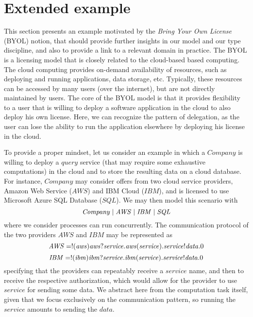 \section{Extended example}\label{sec:BYOL_example}

This section presents an example motivated by the \emph{Bring Your Own License} (BYOL)
notion, that should provide further insights in our model and our type discipline, and also to provide a link to 
a relevant domain in practice.
The BYOL is a licensing model that is closely related  to the cloud-based based computing. The cloud computing provides on-demand availability of resources, such as deploying and running applications, data storage, etc. Typically, these resources can be accessed by many users (over the internet), but are not directly maintained by users. The core of the BYOL model is that it provides flexibility to a user that is willing to deploy a software 
application in the cloud to also deploy his own license. Here, we  can recognize the pattern of delegation, as the user can lose the ability to run the application elsewhere by deploying his license in the cloud.

To provide a proper mindset, let us consider an example in which a $\mathit{Company}$ is willing to deploy
a $\mathit{query}$ service (that may require some exhaustive computations) in the cloud 
and to store the resulting data on a 
cloud database. For instance, $\mathit{Company}$ may consider offers from two cloud service providers, 
Amazon Web Service ($\mathit{AWS}$) and IBM Cloud ($\mathit{IBM}$), and is licensed to use  Microsoft Azure SQL Database ($\mathit{SQL}$).
We may then model this scenario with
%
$$ \mathit{Company} \;|\; \mathit{AWS} \;|\; \mathit{IBM} \;|\; \mathit{SQL}$$
%
where we consider processes can run concurrently.
The communication protocol of the two providers $\mathit{AWS}$ and $\mathit{IBM}$ may be represented as
%
$$\mathit{AWS}=!({\mathit{aws}}){\mathit{aws}}?\mathit{service}.\mathit{aws}(\mathit{service}).\mathit{service}!\mathit{data}.0$$
$$\mathit{IBM}=!({\mathit{ibm}}){\mathit{ibm}}?\mathit{service}.\mathit{ibm}(\mathit{service}).\mathit{service}!\mathit{data}.0$$
%
specifying that the providers can repeatably receive a $\mathit{service}$ name, 
and then to receive the respective authorization, which would allow for the provider to use $\mathit{service}$ for sending
some data. %
We abstract here from the computation task itself, given that we focus exclusively on the
communication pattern, so running the $\mathit{service}$ amounts to sending the 
$\mathit{data}$.

